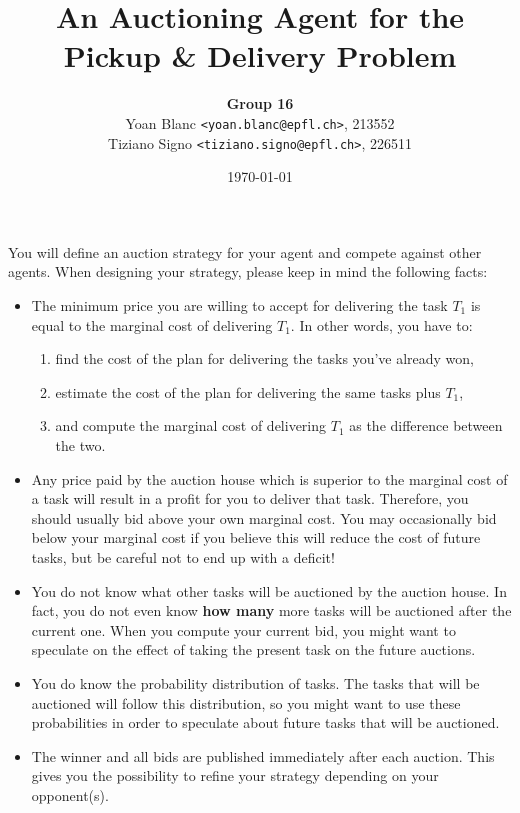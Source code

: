 \documentclass[11pt,a4paper]{article}
\title{\phantomsection%
    \Large{An Auctioning Agent for the Pickup \& Delivery Problem}
}
\author{
\textbf{    \small{Group 16}}\\
    \small{Yoan Blanc \texttt{<yoan.blanc@epfl.ch>}, 213552}\\
    \small{Tiziano Signo \texttt{<tiziano.signo@epfl.ch>}, 226511}
}
\date{\small{\today}}
\begin{document}
\maketitle

\noindent
{\it

    You will define an auction strategy for your agent and compete against other agents.
    When designing your strategy, please keep in mind the following facts:

    \begin{itemize}
        \item The minimum price you are willing to accept for delivering the
            task $T_1$ is equal to the marginal cost of delivering $T_1$. In other
            words, you have to:

            \begin{enumerate}
                \item find the cost of the plan for delivering the tasks you've
                    already won,

                \item estimate the cost of the plan for delivering the same
                    tasks plus $T_1$,

                \item and compute the marginal cost of delivering $T_1$ as the
                    difference between the two.

            \end{enumerate}
        \item Any price paid by the auction house which is superior to the
            marginal cost of a task will result in a profit for you to deliver
            that task. Therefore, you should usually bid above your own
            marginal cost. You may occasionally bid below your marginal cost if
            you believe this will reduce the cost of future tasks, but be
            careful not to end up with a deficit!

        \item You do not know what other tasks will be auctioned by the auction
            house. In fact, you do not even know \textbf{how many} more tasks will be
            auctioned after the current one. When you compute your current bid,
            you might want to speculate on the effect of taking the present
            task on the future auctions.

        \item You do know the probability distribution of tasks. The tasks that
            will be auctioned will follow this distribution, so you might want
            to use these probabilities in order to speculate about future tasks
            that will be auctioned.

        \item The winner and all bids are published immediately after each
            auction. This gives you the possibility to refine your strategy
            depending on your opponent(s).

    \end{itemize}
}
\end{document}
